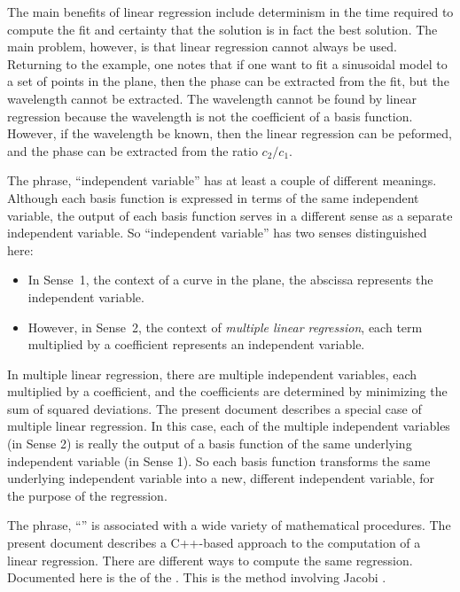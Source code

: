 \documentclass[twocolumn]{article}
\begin{document}
The main benefits of linear regression include determinism in the time required
to compute the fit and certainty that the solution is in fact the best
solution. The main problem, however, is that linear regression cannot always be
used.  Returning to the example, one notes that if one want to fit a sinusoidal
model to a set of points in the plane, then the phase can be extracted from the
fit, but the wavelength cannot be extracted. The wavelength cannot be found by
linear regression because the wavelength is not the coefficient of a basis
function.  However, if the wavelength be known, then the linear regression can
be peformed, and the phase can be extracted from the ratio $c_2/c_1$.

The phrase, ``independent variable'' has at least a couple of different
meanings. Although each basis function is expressed in terms of the same
independent variable, the output of each basis function serves in a different
sense as a separate independent variable. So ``independent variable'' has two
senses distinguished here:
\begin{itemize}
   \item In Sense~1, the context of a curve in the plane, the abscissa
      represents the independent variable.
   \item However, in Sense~2, the context of \emph{multiple linear regression},
      each term multiplied by a coefficient represents an independent variable.
\end{itemize}
In multiple linear regression, there are multiple independent variables, each
multiplied by a coefficient, and the coefficients are determined by minimizing
the sum of squared deviations.  The present document describes a special case
of multiple linear regression. In this case, each of the multiple independent
variables (in Sense 2) is really the output of a basis function of the same
underlying independent variable (in Sense 1). So each basis function transforms
the same underlying independent variable into a new, different independent
variable, for the purpose of the regression.

The phrase, ``'' is associated
with a wide variety of mathematical procedures. The present document describes
a C++-based approach to the computation of a linear regression.  There are
different ways to compute the same regression. Documented here is the
of the .  This is the
method involving Jacobi .
\end{document}
